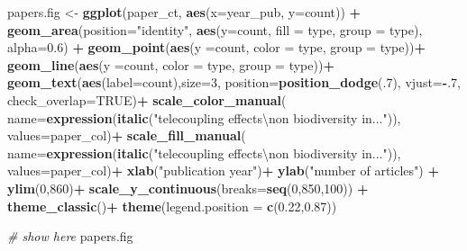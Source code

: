 \documentclass[
]{article}
\newenvironment{Shaded}{\begin{snugshade}}{\end{snugshade}}
\newcommand{\CharTok}[1]{\textcolor[rgb]{0.31,0.60,0.02}{#1}}
\newcommand{\CommentTok}[1]{\textcolor[rgb]{0.56,0.35,0.01}{\textit{#1}}}
\newcommand{\DataTypeTok}[1]{\textcolor[rgb]{0.13,0.29,0.53}{#1}}
\newcommand{\DecValTok}[1]{\textcolor[rgb]{0.00,0.00,0.81}{#1}}
\newcommand{\FloatTok}[1]{\textcolor[rgb]{0.00,0.00,0.81}{#1}}
\newcommand{\KeywordTok}[1]{\textcolor[rgb]{0.13,0.29,0.53}{\textbf{#1}}}
\newcommand{\NormalTok}[1]{#1}
\newcommand{\OperatorTok}[1]{\textcolor[rgb]{0.81,0.36,0.00}{\textbf{#1}}}
\newcommand{\OtherTok}[1]{\textcolor[rgb]{0.56,0.35,0.01}{#1}}
\newcommand{\StringTok}[1]{\textcolor[rgb]{0.31,0.60,0.02}{#1}}
\begin{document}
\begin{Shaded}
\begin{Highlighting}[]
\NormalTok{  papers.fig <-}\StringTok{ }\KeywordTok{ggplot}\NormalTok{(paper_ct, }\KeywordTok{aes}\NormalTok{(}\DataTypeTok{x=}\NormalTok{year_pub, }\DataTypeTok{y=}\NormalTok{count)) }\OperatorTok{+}\StringTok{ }
\StringTok{                  }\KeywordTok{geom_area}\NormalTok{(}\DataTypeTok{position=}\StringTok{"identity"}\NormalTok{,}
                            \KeywordTok{aes}\NormalTok{(}\DataTypeTok{y=}\NormalTok{count, }\DataTypeTok{fill =}\NormalTok{ type, }\DataTypeTok{group =}\NormalTok{ type), }\DataTypeTok{alpha=}\FloatTok{0.6}\NormalTok{) }\OperatorTok{+}
\StringTok{                  }\KeywordTok{geom_point}\NormalTok{(}\KeywordTok{aes}\NormalTok{(}\DataTypeTok{y =}\NormalTok{count, }\DataTypeTok{color =}\NormalTok{ type, }\DataTypeTok{group =}\NormalTok{ type))}\OperatorTok{+}
\StringTok{                  }\KeywordTok{geom_line}\NormalTok{(}\KeywordTok{aes}\NormalTok{(}\DataTypeTok{y =}\NormalTok{count, }\DataTypeTok{color =}\NormalTok{ type, }\DataTypeTok{group =}\NormalTok{ type))}\OperatorTok{+}
\StringTok{                  }\KeywordTok{geom_text}\NormalTok{(}\KeywordTok{aes}\NormalTok{(}\DataTypeTok{label=}\NormalTok{count),}\DataTypeTok{size=}\DecValTok{3}\NormalTok{,}
                            \DataTypeTok{position=}\KeywordTok{position_dodge}\NormalTok{(.}\DecValTok{7}\NormalTok{),}
                            \DataTypeTok{vjust=}\OperatorTok{-}\NormalTok{.}\DecValTok{7}\NormalTok{,}
                            \DataTypeTok{check_overlap=}\OtherTok{TRUE}\NormalTok{)}\OperatorTok{+}
\StringTok{                  }\KeywordTok{scale_color_manual}\NormalTok{(}
                  \DataTypeTok{name=}\KeywordTok{expression}\NormalTok{(}\KeywordTok{italic}\NormalTok{(}\StringTok{"telecoupling effects}\CharTok{\textbackslash{}n}\StringTok{on biodiversity in..."}\NormalTok{)),}
                  \DataTypeTok{values=}\NormalTok{paper_col)}\OperatorTok{+}
\StringTok{                  }\KeywordTok{scale_fill_manual}\NormalTok{(}
                  \DataTypeTok{name=}\KeywordTok{expression}\NormalTok{(}\KeywordTok{italic}\NormalTok{(}\StringTok{"telecoupling effects}\CharTok{\textbackslash{}n}\StringTok{on biodiversity in..."}\NormalTok{)),}
                  \DataTypeTok{values=}\NormalTok{paper_col)}\OperatorTok{+}
\StringTok{                  }\KeywordTok{xlab}\NormalTok{(}\StringTok{"publication year"}\NormalTok{)}\OperatorTok{+}
\StringTok{                  }\KeywordTok{ylab}\NormalTok{(}\StringTok{"number of articles"}\NormalTok{) }\OperatorTok{+}\StringTok{ }\KeywordTok{ylim}\NormalTok{(}\DecValTok{0}\NormalTok{,}\DecValTok{860}\NormalTok{)}\OperatorTok{+}
\StringTok{                  }\KeywordTok{scale_y_continuous}\NormalTok{(}\DataTypeTok{breaks=}\KeywordTok{seq}\NormalTok{(}\DecValTok{0}\NormalTok{,}\DecValTok{850}\NormalTok{,}\DecValTok{100}\NormalTok{)) }\OperatorTok{+}
\StringTok{                  }\KeywordTok{theme_classic}\NormalTok{()}\OperatorTok{+}
\StringTok{                  }\KeywordTok{theme}\NormalTok{(}\DataTypeTok{legend.position =} \KeywordTok{c}\NormalTok{(}\FloatTok{0.22}\NormalTok{,}\FloatTok{0.87}\NormalTok{))}
  
\CommentTok{# show here}
\NormalTok{  papers.fig}
\end{Highlighting}
\end{Shaded}
\end{document}
